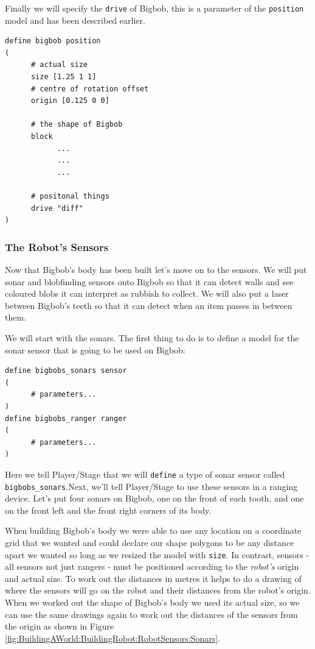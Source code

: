 \documentclass[a4paper]{report}
\newcommand{\plst}{Player/Stage\xspace}
\begin{document}
Finally we will specify the \verb|drive| of Bigbob, this is a parameter of the \verb|position| model and has been described earlier.
\begin{verbatim}
define bigbob position
(
      # actual size
      size [1.25 1 1]
      # centre of rotation offset
      origin [0.125 0 0]

      # the shape of Bigbob
      block
            ...
            ...
            ...
      
      # positonal things
      drive "diff"
)
\end{verbatim}


\subsubsection{The Robot's Sensors}\label{sec:BuildingAWorld:BuildingRobot:ExampleRobot:RobotSensors}
Now that Bigbob's body has been built let's move on to the sensors. We will put sonar and blobfinding sensors onto Bigbob so that it can detect walls and see coloured blobs it can interpret as rubbish to collect. We will also put a laser between Bigbob's teeth so that it can detect when an item passes in between them.

We will start with the sonars. The first thing to do is to define a model
for the sonar sensor that is going to be used on Bigbob:
\begin{verbatim}
define bigbobs_sonars sensor
(
      # parameters...
)
define bigbobs_ranger ranger
(
      # parameters...
)
\end{verbatim}
Here we tell \plst that we will \verb|define| a type of sonar sensor called \verb|bigbobs_sonars|.Next, we'll tell Player/Stage to use these sensors in a ranging device. Let's put four sonars on Bigbob, one on the front of each tooth, and one on the front left and the front right corners of its body. 

When building Bigbob's body we were able to use any location on a coordinate grid that we wanted and could declare our shape polygons to be any distance apart we wanted so long as we resized the model with \verb|size|. In contrast, sensors - all sensors not just rangers - must be positioned according to the \emph{robot's} origin and actual size. To work out the distances in metres it helps to do a drawing of where the sensors will go on the robot and their distances from the robot's origin. When we worked out the shape of Bigbob's body we used its actual size, so we can use the same drawings again to work out the distances of the sensors from the origin as shown in Figure \ref{fig:BuildingAWorld:BuildingRobot:RobotSensors:Sonars}.
\end{document}
